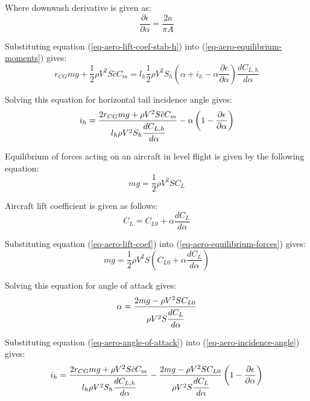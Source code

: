 Where downwash derivative is given as: \cite{Paturski09}
\begin{equation}
  \frac{\partial \epsilon}{\partial \alpha}
  =
  \frac{2a}{\pi A}
\end{equation}

Substituting equation (\ref{eq-aero-lift-coef-stab-h}) into (\ref{eq-aero-equilibrium-moments}) gives:
\begin{equation}
  r_{CG} mg + \frac{1}{2} \rho V^2 S \hat c C_m
  =
  l_h \frac{1}{2} \rho V^2 S_h
  \left(
  \alpha + i_h - \alpha \frac{\partial \epsilon}{\partial \alpha}
  \right)
  \frac{d C_{L,h}}{d \alpha}
\end{equation}

Solving this equation for horizontal tail incidence angle gives:
\begin{equation}
  \label{eq-aero-incidence-angle}
  i_h = 
  \frac{ 2 r_{CG} mg + \rho V^2 S \hat c C_m }
  { l_h \rho V^2 S_h \cfrac{d C_{L,h}}{d \alpha} }
  -
  \alpha \left( 1 - \frac{\partial \epsilon}{\partial \alpha} \right)
\end{equation}

Equilibrium of forces acting on an aircraft in level flight is given by the following equation:
\begin{equation}
  \label{eq-aero-equilibrium-forces}
  mg = \frac{1}{2} \rho V^2 S C_L
\end{equation}

Aircraft lift coefficient is given as follows:
\begin{equation}
  \label{eq-aero-lift-coef}
  C_L = C_{L0} + \alpha \frac{d C_L}{d \alpha}
\end{equation}

Substituting equation (\ref{eq-aero-lift-coef}) into (\ref{eq-aero-equilibrium-forces}) gives:
\begin{equation}
  mg = \frac{1}{2} \rho V^2 S
  \left( C_{L0} + \alpha \frac{d C_L}{d \alpha} \right)
\end{equation}

Solving this equation for angle of attack gives:
\begin{equation}
  \label{eq-aero-angle-of-attack}
  \alpha = 
  \frac{ 2mg - \rho V^2 S C_{L0} }{ \rho V^2 S \cfrac{d C_L}{d \alpha} }
\end{equation}

Substituting equation (\ref{eq-aero-angle-of-attack}) into (\ref{eq-aero-incidence-angle}) gives:
\begin{equation}
  i_h =
  \frac{ 2 r_{CG} mg + \rho V^2 S \hat c C_m }
  { l_h \rho V^2 S_h \cfrac{d C_{L,h}}{d \alpha} }
  -
  \frac{ 2mg - \rho V^2 S C_{L0} }
  { \rho V^2 S \cfrac{d C_L}{d \alpha} }
  \left( 1 - \frac{\partial \epsilon}{\partial \alpha} \right)
\end{equation}


